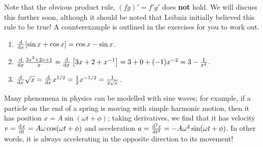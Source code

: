 Note that the obvious product rule, $ (fg)' = f'g' $ does \textbf{not} hold. We will discuss this further soon,
although it should be noted that Leibniz initially believed this rule to be true! A counterexample is outlined in the
exercises for you to work out.

\begin{exs}\leavevmode
  \begin{enumerate}
    \item $ \od{}{x} [\sin x + \cos x] = \cos x - \sin x $.
    \item $ \od{}{x} \frac{3x^2 + 2x + 1}{x} = \od{}{x} \left[ 3x + 2 + x^{-1} \right] = 3 + 0 + (-1)x^{-2} = 3 - \frac{1}{x^2} $.
    \item $ \od{}{x} \sqrt{x} = \od{}{x} x^{1/2} = \frac{1}{2}x^{-1/2} = \frac{1}{2\sqrt{x}} $.
  \end{enumerate}
\end{exs}

\begin{app}
  Many phenomena in physics can be modelled with sine waves; for example, if a particle on the end of a spring
  is moving with simple harmonic motion, then it has position $ x = A \sin (\omega t + \phi) $; taking derivatives,
  we find that it has velocity $ v = \od{x}{t} = A\omega \cos (\omega t + \phi) $ and acceleration $ a = \od[2]{x}{t} = -A \omega^2 \sin (\omega t + \phi) $.
  In other words, it is always accelerating in the opposite direction to its movement!
\end{app}

\clearpage

